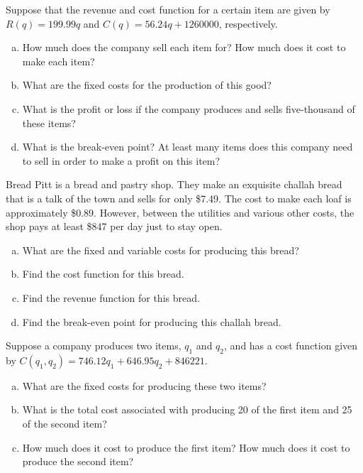 \documentclass[11pt,letterpaper]{article}
\begin{document}

 Suppose that the revenue and cost function for a certain item are given by $R(q)= 199.99q$ and $C(q)= 56.24q + 1260000$, respectively. 
	\begin{enumerate}[(a)]
	\item How much does the company sell each item for? How much does it cost to make each item?
	\item What are the fixed costs for the production of this good?
	\item What is the profit or loss if the company produces and sells five-thousand of these items?
	\item What is the break-even point? At least many items does this company need to sell in order to make a profit on this item?
	\end{enumerate}



\newpage



 Bread Pitt is a bread and pastry shop. They make an exquisite challah bread that is a talk of the town and sells for only \$7.49. The cost to make each loaf is approximately \$0.89. However, between the utilities and various other costs, the shop pays at least \$847 per day just to stay open. 
	\begin{enumerate}[(a)]
	\item What are the fixed and variable costs for producing this bread?
	\item Find the cost function for this bread.
	\item Find the revenue function for this bread.
	\item Find the break-even point for producing this challah bread. 
	\end{enumerate}



\newpage



 Suppose a company produces two items, $q_1$ and $q_2$, and has a cost function given by $C(q_1, q_2)= 746.12q_1 + 646.95q_2 + 846221$. 
	\begin{enumerate}[(a)]
	\item What are the fixed costs for producing these two items?
	\item What is the total cost associated with producing 20 of the first item and 25 of the second item?
	\item How much does it cost to produce the first item? How much does it cost to produce the second item?
	\end{enumerate}
\end{document}
